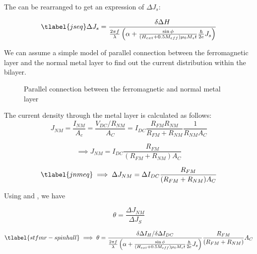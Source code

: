 The  can be rearranged to get an expression of $\Delta J_{s}$:

\begin{equation}
    \tlabel{jseq}
    \Delta J_{s} = \frac{\delta \Delta H}{
        \frac{2\pi f}{\lambda} \left( 
        \alpha + \frac{\sin{\phi}}{(H_{ext} + 0.5M_{eff}) \mu_{0} M_{s} t} 
        \frac{\hbar}{2e}J_{s}
        \right)
    }
\end{equation}

We can assume a simple model of parallel connection between the ferromagnetic layer and 
the normal metal layer to find out the current distribution within the bilayer.

\begin{figure}
   
    \centering
    

    \caption{Parallel connection between the ferromagnetic and normal metal layer}
    
\end{figure}

The current density through the metal layer is calculated as follows:
\begin{equation}
        J_{NM} = \frac{I_{NM}}{A_{c}} = \frac{V_{DC}/R_{NM}}{A_{C}} 
        = I_{DC} \frac{R_{FM} R_{NM}}{R_{FM} + R_{NM}} \frac{1}{R_{NM} A_{C}}
\end{equation}

\begin{equation}
    \implies J_{NM} = I_{DC} \frac{R_{FM}}{(R_{FM} + R_{NM})A_C}
\end{equation}

\begin{equation}
    \tlabel{jnmeq}
    \implies \Delta J_{NM} = \Delta I_{DC} \frac{R_{FM}}{(R_{FM} + R_{NM})A_C}
\end{equation}


Using  and  , we have

\begin{equation}
    \theta = \frac{\Delta J_{NM}}{\Delta J_{S}}
\end{equation}

\begin{equation}
    \tlabel{stfmr-spinhall}
    \implies \theta = \frac{\delta \Delta I_{H}/\delta \Delta I_{DC}}{
        \frac{2\pi f}{\lambda} \left( 
        \alpha + \frac{\sin{\phi}}{(H_{ext} + 0.5M_{eff}) \mu_{0} M_{s} t} 
        \frac{\hbar}{2e}J_{s}
        \right)
    } \frac{R_{FM}}{(R_{FM} + R_{NM})}A_C
\end{equation}

